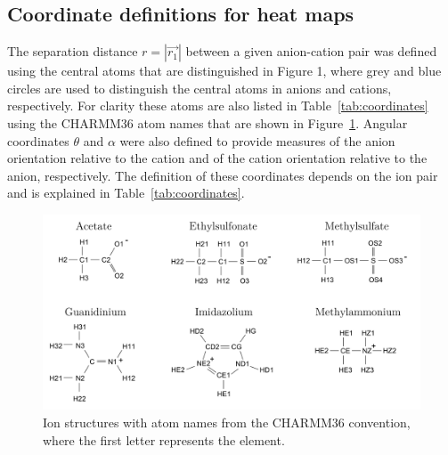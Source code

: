 \documentclass[journal=jacsat,articletitle=true,manuscript=suppinfo,layout=onecolumn]{achemso}
\begin{document}
    
    \subsection{Coordinate definitions for heat maps}

    The separation distance $r = | \vec{r_1} |$ between a given anion-cation pair was defined using the central atoms that are distinguished in Figure 1, where grey and blue circles are used to distinguish the central atoms in anions and cations, respectively.
    For clarity these atoms are also listed in Table~\ref{tab:coordinates} using the CHARMM36 atom names that are shown in Figure~\ref{fig:charmm_atom_names}. Angular coordinates $\theta$ and $\alpha$ were also defined to provide measures of the anion orientation relative to the cation and of the cation orientation relative to the anion, respectively. The definition of these coordinates depends on the ion pair and is explained in Table~\ref{tab:coordinates}.
    
    \begin{figure}[H]
    \begin{center}
        \includegraphics[width=\columnwidth]{images/charmm_atom_names_2.png}
        \caption{Ion structures with atom names from the CHARMM36 convention,\cite{Huang2013} where the first letter represents the element.}
        \label{fig:charmm_atom_names}
    \end{center}
    \end{figure}
\end{document}
